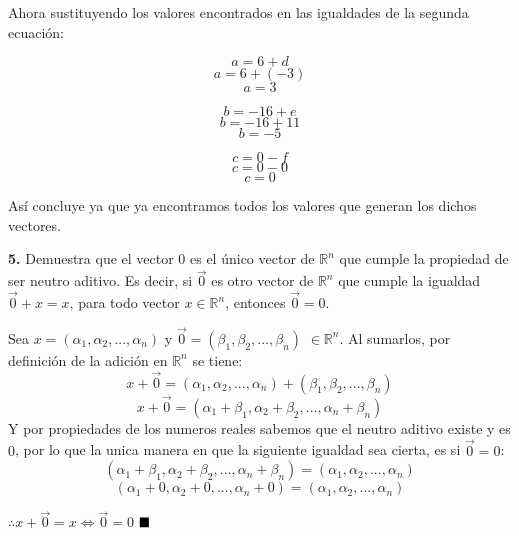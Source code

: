 \documentclass{article}
\begin{document}
\par \textbullet Ahora sustituyendo los valores encontrados en las igualdades de la segunda ecuación:

\begin{minipage}[c]{0.5cm}
    $$a = 6 + d$$
    $$a = 6 +(-3)$$
    $$a = 3$$
\end{minipage}\hspace*{3cm}
\begin{minipage}[c]{0.5cm}
    $$b = -16 + e$$
    $$b = -16 + 11$$
    $$b = -5$$
\end{minipage}\hspace*{3cm}
\begin{minipage}[c]{0.5cm}
    $$c = 0 - f$$
    $$c = 0-0$$
    $$c = 0$$
\end{minipage}\newline %

Así concluye ya que ya encontramos todos los valores que generan los dichos vectores.\newline

\textbf{5.} Demuestra que el vector $0$ es el único vector de $\mathbb{R}^n$ que cumple la 
propiedad de ser neutro aditivo. Es decir, si $\vec{0}$ es otro vector de $\mathbb{R}^n$ que cumple la 
igualdad $\vec{0}+x = x$, para todo vector $x \in \mathbb{R}^n$, entonces $\vec{0}= 0$. \newline

Sea $x =(\alpha_1, \alpha_2, ... , \alpha_n)$  y  $\vec{0} = (\beta_1, \beta_2, ...,\beta_n)$ $\in \mathbb{R}^n$. 
Al sumarlos, por definición de la adición en $\mathbb{R}^n$ se tiene:
$$x+\vec{0} = (\alpha_1, \alpha_2, ... , \alpha_n)+(\beta_1, \beta_2, ...,\beta_n)$$
$$x + \vec{0} = (\alpha_1+\beta_1, \alpha_2+\beta_2, ... , \alpha_n+\beta_n)$$
Y por propiedades de los numeros reales sabemos que el neutro aditivo existe y es $0$, por lo que la unica manera en que la siguiente 
igualdad sea cierta, es si $\vec{0} = 0$: 
$$(\alpha_1+\beta_1, \alpha_2+\beta_2, ... , \alpha_n+\beta_n) = (\alpha_1, \alpha_2, ... , \alpha_n)$$
$$(\alpha_1+0, \alpha_2+0, ... , \alpha_n+0) = (\alpha_1, \alpha_2, ... , \alpha_n)$$

$\therefore x+\vec{0} = x \iff \vec{0} = 0$
$\hfill\blacksquare$
\end{document}
